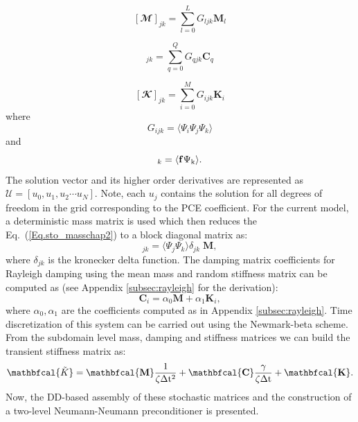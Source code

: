 \documentclass{article}
\begin{document}
\begin{equation}\label{Eq.sto_masschap2}
[\mathbfcal{M}]_{jk} = \sum_{l=0} ^{L} G_{ljk} \mathbf{M}_{l}  
\end{equation}

\begin{equation}
[\mathbfcal{C}]_{jk} = \sum_{q=0} ^{Q} G_{qjk} \mathbf{C}_{q} 
\end{equation}

\begin{equation}\label{Eq.stok}
[\mathbfcal{K}]_{jk}  = \sum_{i=0} ^{M} G_{ijk} \mathbf{K}_{i} 
\end{equation}
where
\begin{equation}
 G_{ijk} =  \langle \Psi_{i} \Psi_{j} \Psi_{k} \rangle
 \end{equation}
 and
\begin{equation}
[\mathcal{F}]_{k}  = \langle \bf{f} \mathrm{\Psi_{k}} \rangle.
\end{equation} 
The solution vector and its higher order derivatives are represented as $\mathcal{U} = [ u_0, u_1, u_2 \cdots u_N ] $. Note, each $u_j$ contains the solution for all degrees of freedom in the grid corresponding to the PCE coefficient. For the current model, a deterministic mass matrix is used which then reduces the Eq.~(\ref{Eq.sto_masschap2}) to a block diagonal matrix as:
 \begin{equation}
[\mathbfcal{M}]_{jk}  =  \langle\Psi_{j}\Psi_{k}\rangle \delta_{jk} \; \mathbf{M},
\end{equation}
where $\delta_{jk}$ is the kronecker delta function. The damping matrix coefficients for Rayleigh damping using the mean mass and random stiffness matrix can be computed as (see Appendix \ref{subsec:rayleigh} for the derivation):
 \begin{equation}
 \mathbf{C}_{i}  = \alpha_0 \mathbf{M} + \alpha_1 \mathbf{K}_{i},
\end{equation}
where $\alpha_0, \alpha_1$ are the coefficients computed as in Appendix \ref{subsec:rayleigh}. Time discretization of this system can be carried out using the Newmark-beta scheme. From the subdomain level mass, damping and stiffness matrices we can build the transient stiffness matrix as:
\begin{equation}\label{Eq:K_T_Sto}
\mathbfcal{\tilde{{K}}}  = \bf{\mathbfcal{M}} \frac{\mathrm{1}}{\zeta \mathrm{\Delta t^2}} + \bf{\mathbfcal{C}}  \frac{\gamma}{\zeta \mathrm{\Delta t} } + {\mathbfcal{K}}.	
\end{equation}
Now, the DD-based assembly of these stochastic matrices and the construction of a two-level Neumann-Neumann preconditioner is presented.
\end{document}
